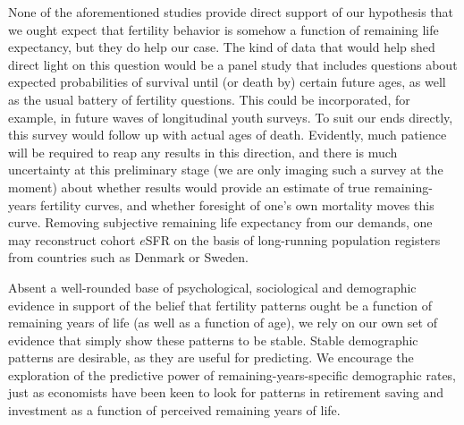 None of the aforementioned studies provide
direct support of our hypothesis that we ought expect that fertility behavior is
somehow a function of remaining life expectancy, but they do help our case.
The kind of data that would help shed direct light on this question would be a
panel study that includes questions about expected probabilities of survival
until (or death by) certain future ages, as well as the usual battery of 
fertility questions. This could be incorporated, for example, in future waves of
longitudinal youth surveys. To suit our ends directly, this survey would follow
up with actual ages of death. Evidently, much patience will be required to reap
any results in this direction, and there is much uncertainty at this preliminary
stage (we are only imaging such a survey at the moment) about whether results
would provide an estimate of true remaining-years fertility curves, and whether
foresight of one's own mortality moves this curve. Removing subjective
remaining life expectancy from our demands, one may reconstruct cohort $e$SFR on 
the basis of long-running population registers from countries such as Denmark or
Sweden.

Absent a well-rounded base of psychological, sociological and demographic
evidence in support of the belief that fertility patterns ought be a function of
remaining years of life (as well as a function of age), we rely on our own
set of evidence that simply show these patterns to be stable. Stable demographic
patterns are desirable, as they are useful for predicting. We encourage
the exploration of the predictive power of remaining-years-specific
demographic rates, just as economists have been keen to look for patterns in
retirement saving and investment as a function of perceived remaining years of
life.
